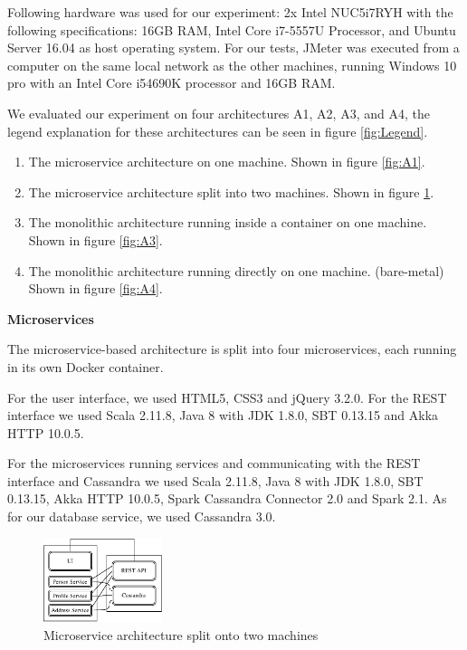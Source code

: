 \documentclass[a4paper,oneside]{bth}
\begin{document}
\par\vspace {0.5cm}
Following hardware was used for our experiment: 2x Intel NUC5i7RYH with the following specifications: 16GB RAM, Intel Core i7-5557U Processor, and Ubuntu Server 16.04 as host operating system.
For our tests, JMeter was executed from a computer on the same local network as the other machines, running Windows 10 pro with an Intel Core i54690K processor and 16GB RAM.

\clearpage
We evaluated our experiment on four architectures A1, A2, A3, and A4, the legend explanation for these architectures can be seen in figure \ref{fig:Legend}. 

\begin{enumerate}[label=A\arabic*]

\item The microservice architecture on one machine. Shown in figure \ref{fig:A1}.
\item The microservice architecture split into two machines. Shown in figure \ref{fig:A2}.
\item The monolithic architecture running inside a container on one machine. Shown in figure \ref{fig:A3}.
\item The monolithic architecture running directly on one machine. (bare-metal) Shown in figure \ref{fig:A4}.

\end{enumerate}

\textbf{Microservices}

The microservice-based architecture is split into four microservices, each running in its own Docker container.

\par\vspace {0.5cm}
For the user interface, we used HTML5, CSS3 and jQuery 3.2.0. For the REST interface we used Scala 2.11.8, Java 8 with JDK 1.8.0, SBT 0.13.15 and Akka HTTP 10.0.5.

\par\vspace {0.5cm}
For the microservices running services and communicating with the REST interface and Cassandra we used Scala 2.11.8, Java 8 with JDK 1.8.0, SBT 0.13.15, Akka HTTP 10.0.5, Spark Cassandra Connector 2.0 and Spark 2.1. As for our database service, we used Cassandra 3.0.

\begin{figure}[h]
\begin{center}

\includegraphics[width=0.31\textwidth]{A2/A2}
\caption{Microservice architecture split onto two machines}
\label{fig:A2}

\end{center}
\end{figure}
\end{document}
